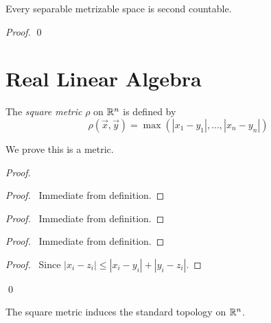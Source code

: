 \begin{proposition}
    Every separable metrizable space is second countable.
\end{proposition}

\begin{proof}
    \pf
    \qed
\end{proof}

\section{Real Linear Algebra}

\begin{definition}
    The \emph{square metric} $\rho$ on $\mathbb{R}^n$ is defined by
    \[ \rho(\vec{x}, \vec{y}) = \max(|x_1 - y_1|, \ldots, |x_n - y_n|) \]
\end{definition}

We prove this is a metric.

\begin{proof}
    \pf
    \begin{proof}
        \pf\ Immediate from definition.
    \end{proof}
    \begin{proof}
        \pf\ Immediate from definition.
    \end{proof}
    \begin{proof}
        \pf\ Immediate from definition.
    \end{proof}
    \begin{proof}
        \pf\ Since $|x_i - z_i| \leq |x_i - y_i| + |y_i - z_i|$.
    \end{proof}
    \qed
\end{proof}

\begin{proposition}
    The square metric induces the standard topology on $\mathbb{R}^n$.
\end{proposition}

